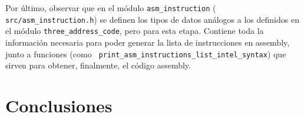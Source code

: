 \documentclass[12pt, a4paper, titlepage]{article}
\begin{document}
	Por último, observar que en el módulo {\tt asm\_instruction} ({\tt
	src/asm\_instruction.h}) se definen los tipos de datos análogos a los
	definidos en el módulo {\tt three\_address\_code}, pero para esta etapa.
	Contiene toda la información necesaria para poder generar la lista de
	instrucciones en assembly, junto a funciones (como {\tt
	print\_asm\_instructions\_list\_intel\_syntax}) que sirven para obtener,
	finalmente, el código assembly.

  \section{Conclusiones}\label{sec:conclusions}
\end{document}
